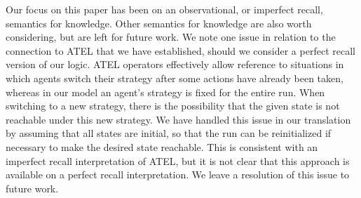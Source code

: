 \documentclass[a4wide]{article}
\theoremstyle{examplesty}
\begin{document}
Our focus on this paper has been on an observational, or imperfect recall, 
semantics for knowledge. Other semantics for knowledge are also 
worth considering, 
but are left for future work. 
We note one issue in relation to the connection to ATEL that we
have established, should we consider a perfect recall version of our logic. 
ATEL operators effectively allow reference to situations in which agents switch their strategy
after some actions have already been taken, whereas in our model an agent's strategy is fixed for the 
entire run. When switching to a new strategy, there is the possibility that the given state is not 
reachable under this new strategy. 
We have handled this issue in our translation by assuming that all states are initial, so that 
the run can be reinitialized if necessary to make the desired state reachable. 
This is consistent with an imperfect recall interpretation of ATEL, but it is not
clear that this approach is available on a perfect recall interpretation. 
We leave a resolution of this issue to future work.  



\end{document}
